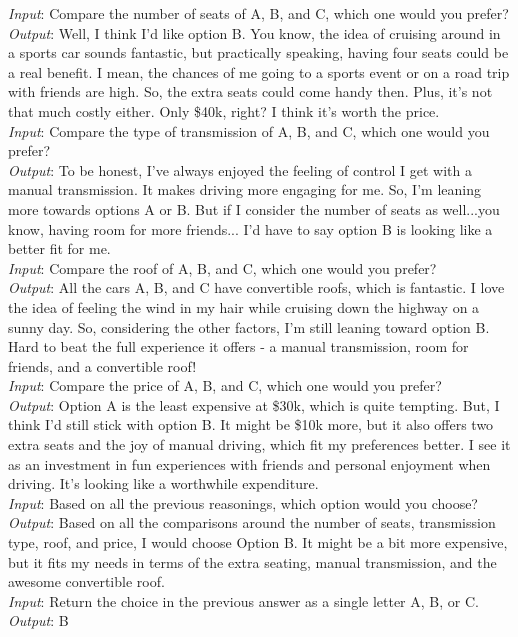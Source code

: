 \vspace{15pt}

\begin{mdframed}
{\footnotesize
\textit{Input}: Compare the number of seats of A, B, and C, which one would you prefer?\\
\textit{Output}: Well, I think I'd like option B. You know, the idea of cruising around in a sports car sounds fantastic, but practically speaking, having four seats could be a real benefit. I mean, the chances of me going to a sports event or on a road trip with friends are high. So, the extra seats could come handy then. Plus, it's not that much costly either. Only \$40k, right? I think it's worth the price.
\\
\textit{Input}: Compare the type of transmission of A, B, and C, which one would you prefer?\\
\textit{Output}: To be honest, I've always enjoyed the feeling of control I get with a manual transmission. It makes driving more engaging for me. So, I'm leaning more towards options A or B. But if I consider the number of seats as well...you know, having room for more friends... I'd have to say option B is looking like a better fit for me.\\
\textit{Input}: Compare the roof of A, B, and C, which one would you prefer?\\
\textit{Output}: All the cars A, B, and C have convertible roofs, which is fantastic. I love the idea of feeling the wind in my hair while cruising down the highway on a sunny day. So, considering the other factors, I'm still leaning toward option B. Hard to beat the full experience it offers - a manual transmission, room for friends, and a convertible roof!\\
\textit{Input}: Compare the price of A, B, and C, which one would you prefer?\\
\textit{Output}: Option A is the least expensive at \$30k, which is quite tempting. But, I think I'd still stick with option B. It might be \$10k more, but it also offers two extra seats and the joy of manual driving, which fit my preferences better. I see it as an investment in fun experiences with friends and personal enjoyment when driving. It's looking like a worthwhile expenditure.\\
\textit{Input}: Based on all the previous reasonings, which option would you choose?\\
\textit{Output}: Based on all the comparisons around the number of seats, transmission type, roof, and price, I would choose Option B. It might be a bit more expensive, but it fits my needs in terms of the extra seating, manual transmission, and the awesome convertible roof.\\
\textit{Input}: Return the choice in the previous answer as a single letter A, B, or C.\\
\textit{Output}: B
}
\end{mdframed}


